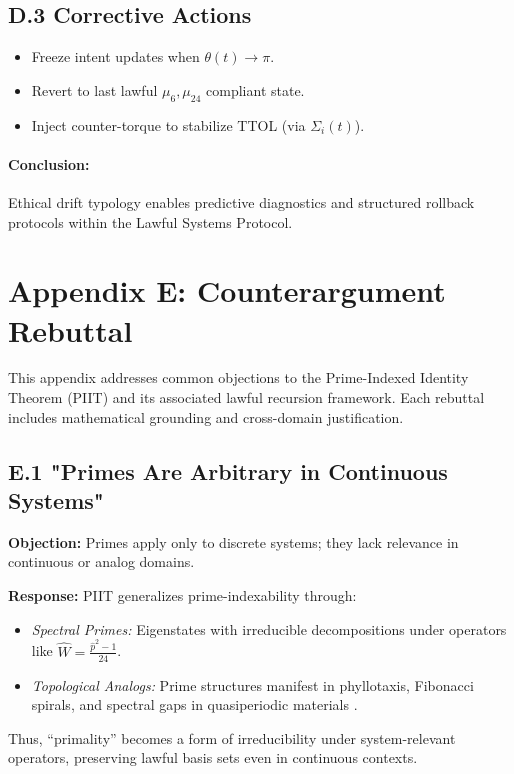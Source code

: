 \documentclass[12pt]{article}
\begin{document}
\subsection*{D.3 Corrective Actions}

\begin{itemize}
  \item Freeze intent updates when $\theta(t) \to \pi$.
  \item Revert to last lawful $\mu_6, \mu_{24}$ compliant state.
  \item Inject counter-torque to stabilize TTOL (via $\Sigma_i(t)$).
\end{itemize}

\paragraph{Conclusion:} Ethical drift typology enables predictive diagnostics and structured rollback protocols within the Lawful Systems Protocol.

\clearpage

\section*{Appendix E: Counterargument Rebuttal}

This appendix addresses common objections to the Prime-Indexed Identity Theorem (PIIT) and its associated lawful recursion framework. Each rebuttal includes mathematical grounding and cross-domain justification.

\subsection*{E.1 "Primes Are Arbitrary in Continuous Systems"}

\textbf{Objection:} Primes apply only to discrete systems; they lack relevance in continuous or analog domains.

\textbf{Response:}
PIIT generalizes prime-indexability through:
\begin{itemize}
  \item \textit{Spectral Primes:} Eigenstates with irreducible decompositions under operators like $\hat{W} = \frac{\hat{p}^2 - 1}{24}$.
  \item \textit{Topological Analogs:} Prime structures manifest in phyllotaxis, Fibonacci spirals, and spectral gaps in quasiperiodic materials \cite{steinhardt1987}.
\end{itemize}
Thus, “primality” becomes a form of irreducibility under system-relevant operators, preserving lawful basis sets even in continuous contexts.
\end{document}
